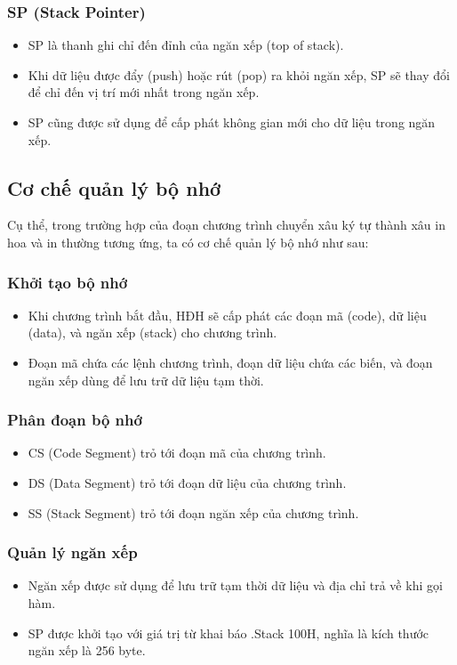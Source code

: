 \subsubsection{SP (Stack Pointer)}
\begin{itemize}
    \item SP là thanh ghi chỉ đến đỉnh của ngăn xếp (top of stack).
    \item Khi dữ liệu được đẩy (push) hoặc rút (pop) ra khỏi ngăn xếp, SP sẽ thay đổi để chỉ đến vị trí mới nhất trong ngăn xếp.
    \item SP cũng được sử dụng để cấp phát không gian mới cho dữ liệu trong ngăn xếp.
\end{itemize}

\subsection{Cơ chế quản lý bộ nhớ}

Cụ thể, trong trường hợp của đoạn chương trình chuyển xâu ký tự thành xâu in hoa và in thường tương ứng, ta có cơ chế quản lý bộ nhớ như sau:

\subsubsection{Khởi tạo bộ nhớ}
\begin{itemize}
    \item Khi chương trình bắt đầu, HĐH sẽ cấp phát các đoạn mã (code), dữ liệu (data), và ngăn xếp (stack) cho chương trình.
    \item Đoạn mã chứa các lệnh chương trình, đoạn dữ liệu chứa các biến, và đoạn ngăn xếp dùng để lưu trữ dữ liệu tạm thời.
\end{itemize}

\subsubsection{Phân đoạn bộ nhớ}
\begin{itemize}
    \item CS (Code Segment) trỏ tới đoạn mã của chương trình.
    \item DS (Data Segment) trỏ tới đoạn dữ liệu của chương trình.
    \item SS (Stack Segment) trỏ tới đoạn ngăn xếp của chương trình.
\end{itemize}

\subsubsection{Quản lý ngăn xếp}
\begin{itemize}
    \item Ngăn xếp được sử dụng để lưu trữ tạm thời dữ liệu và địa chỉ trả về khi gọi hàm.
    \item SP được khởi tạo với giá trị từ khai báo .Stack 100H, nghĩa là kích thước ngăn xếp là 256 byte.
\end{itemize}



